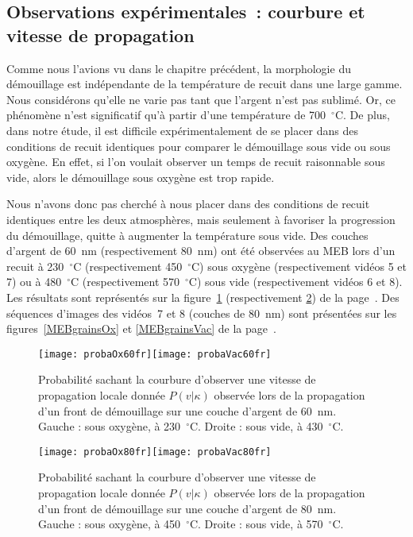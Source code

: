 {{		\subsection{Observations expérimentales~: courbure et vitesse de propagation}
Comme nous l’avions vu dans le chapitre précédent, la morphologie du démouillage est indépendante de la température de recuit dans une large gamme. Nous considérons qu’elle ne varie pas tant que l’argent n’est pas sublimé. Or, ce phénomène n’est significatif qu’à partir d’une température de 700~$^\circ$C. De plus, dans notre étude, il est difficile expérimentalement de se placer dans des conditions de recuit identiques pour comparer le démouillage sous vide ou sous oxygène. En effet, si l’on voulait observer un temps de recuit raisonnable sous vide, alors le démouillage sous oxygène est trop rapide.\par 
Nous n’avons donc pas cherché à nous placer dans des conditions de recuit identiques entre les deux atmosphères, mais seulement à favoriser la progression du démouillage, quitte à augmenter la température sous vide. Des couches d’argent de 60~nm (respectivement 80~nm) ont été observées au MEB lors d’un recuit à 230~$^\circ$C (respectivement 450~$^\circ$C) sous oxygène (respectivement vidéos 5 et 7)  ou à 480~$^\circ$C (respectivement 570~$^\circ$C) sous vide (respectivement vidéos 6 et 8). Les résultats sont représentés sur la figure~\ref{proba60} (respectivement \ref{proba80}) de la page~\pageref{proba60}.
Des séquences d'images des vidéos~7 et 8 (couches de 80~nm) sont présentées sur les figures~\ref{MEBgrainsOx} et \ref{MEBgrainsVac} de la page~\pageref{MEBgrainsOx}.\par 
\begin{figure}[!p]
\centering
\texttt{[image: probaOx60fr]}\texttt{[image: probaVac60fr]}
\caption{Probabilité sachant la courbure d’observer une vitesse de propagation locale donnée $P(v|\kappa)$ observée lors de la propagation d’un front de démouillage sur une couche d’argent de 60~nm. Gauche : sous oxygène, à 230~$^\circ$C. Droite : sous vide, à 430~$^\circ$C.}
\label{proba60}
\end{figure}
\begin{figure}[!p]
\centering
\texttt{[image: probaOx80fr]}\texttt{[image: probaVac80fr]}
\caption{Probabilité sachant la courbure d’observer une vitesse de propagation locale donnée $P(v|\kappa)$ observée lors de la propagation d’un front de démouillage sur une couche d’argent de 80~nm. Gauche : sous oxygène, à 450~$^\circ$C. Droite : sous vide, à 570~$^\circ$C.}
\label{proba80}
\end{figure}

}}
